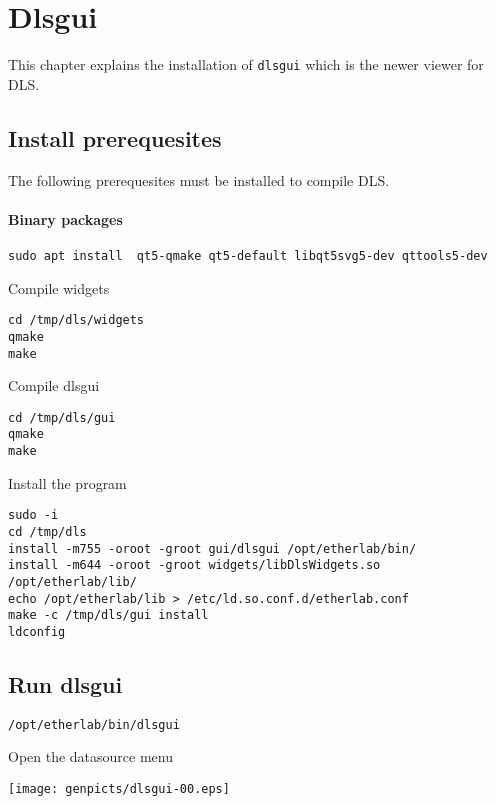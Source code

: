 \chapter{Dlsgui}

\label{chap:dlsgui}
This chapter explains the installation of \texttt{dlsgui} which is the
newer viewer for DLS.

\section{Install prerequesites}

The following prerequesites must be installed to compile DLS.

\subsubsection{Binary packages}
\begin{verbatim}
sudo apt install  qt5-qmake qt5-default libqt5svg5-dev qttools5-dev

\end{verbatim}

\noindent Compile widgets

\begin{verbatim}
cd /tmp/dls/widgets
qmake
make
\end{verbatim}


\noindent Compile dlsgui
\begin{verbatim}
cd /tmp/dls/gui
qmake
make
\end{verbatim}

\noindent Install the program

\begin{verbatim}
sudo -i
cd /tmp/dls
install -m755 -oroot -groot gui/dlsgui /opt/etherlab/bin/
install -m644 -oroot -groot widgets/libDlsWidgets.so  /opt/etherlab/lib/
echo /opt/etherlab/lib > /etc/ld.so.conf.d/etherlab.conf
make -c /tmp/dls/gui install
ldconfig
\end{verbatim}



\section{Run dlsgui}


\begin{verbatim}
/opt/etherlab/bin/dlsgui
\end{verbatim}

\noindent Open the datasource menu
\begin{center}
\texttt{[image: genpicts/dlsgui-00.eps]}
\end{center}

